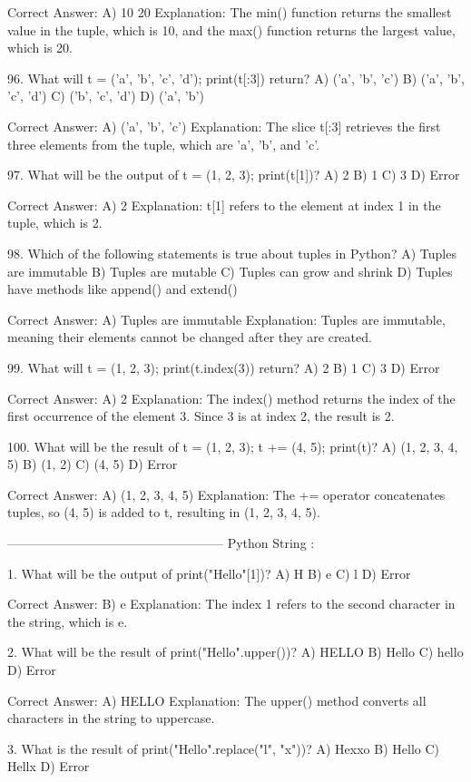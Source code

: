 Correct Answer: A) 10 20
Explanation: The min() function returns the smallest value in the tuple, which is 10, and the max() function returns the largest value, which is 20.

96. What will t = ('a', 'b', 'c', 'd'); print(t[:3]) return?
A) ('a', 'b', 'c')
B) ('a', 'b', 'c', 'd')
C) ('b', 'c', 'd')
D) ('a', 'b')

Correct Answer: A) ('a', 'b', 'c')
Explanation: The slice t[:3] retrieves the first three elements from the tuple, which are 'a', 'b', and 'c'.

97. What will be the output of t = (1, 2, 3); print(t[1])?
A) 2
B) 1
C) 3
D) Error

Correct Answer: A) 2
Explanation: t[1] refers to the element at index 1 in the tuple, which is 2.

98. Which of the following statements is true about tuples in Python?
A) Tuples are immutable
B) Tuples are mutable
C) Tuples can grow and shrink
D) Tuples have methods like append() and extend()

Correct Answer: A) Tuples are immutable
Explanation: Tuples are immutable, meaning their elements cannot be changed after they are created.

99. What will t = (1, 2, 3); print(t.index(3)) return?
A) 2
B) 1
C) 3
D) Error

Correct Answer: A) 2
Explanation: The index() method returns the index of the first occurrence of the element 3. Since 3 is at index 2, the result is 2.

100. What will be the result of t = (1, 2, 3); t += (4, 5); print(t)?
A) (1, 2, 3, 4, 5)
B) (1, 2)
C) (4, 5)
D) Error

Correct Answer: A) (1, 2, 3, 4, 5)
Explanation: The += operator concatenates tuples, so (4, 5) is added to t, resulting in (1, 2, 3, 4, 5).

---------------------------------------------------
Python String :

1. What will be the output of print("Hello"[1])?
A) H
B) e
C) l
D) Error

Correct Answer: B) e
Explanation: The index 1 refers to the second character in the string, which is e.

2. What will be the result of print("Hello".upper())?
A) HELLO
B) Hello
C) hello
D) Error

Correct Answer: A) HELLO
Explanation: The upper() method converts all characters in the string to uppercase.

3. What is the result of print("Hello".replace("l", "x"))?
A) Hexxo
B) Hello
C) Hellx
D) Error

